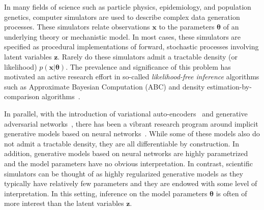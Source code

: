 \documentclass[twocolumn,superscriptaddress,aps]{revtex4-1}
\newcommand{\kcnote}[1]{\textcolor{red}{[KC: #1]}}
\newcommand{\bftheta}{{\bm \theta}}
\newcommand{\bfx}{\mathbf{x}}
\newcommand{\bfz}{\mathbf{z}}
\theoremstyle{plain}
\begin{document}
In many fields of science such as particle physics, epidemiology,  and population
genetics, computer simulators are used to describe complex data generation processes. These simulators relate
observations $\bfx$ to the parameters $\bftheta$ of an underlying theory or mechanistic model.
In most cases, these simulators are specified as procedural implementations of forward, stochastic processes involving latent variables $\bfz$.
Rarely do these simulators admit a tractable density (or likelihood) $p(\bfx |
\bftheta)$. The prevalence and significance of this problem has motivated an
active research effort in so-called \textit{likelihood-free inference}
algorithms such as Approximate Bayesian Computation
(ABC) and density estimation-by-comparison algorithms~\cite{beaumont2002approximate, marjoram2003markov, sisson2007sequential,
sisson2011likelihood, marin2012approximate, cranmer2015approximating}.




In parallel, with the introduction of variational
auto-encoders~\citep{DBLP:journals/corr/KingmaW13} and generative adversarial
networks~\cite{goodfellow2014generative}, there has been a vibrant research
program around implicit generative models based on neural
networks~\citep{2016arXiv161003483M}.  While some of these models
also do not admit a tractable density, they are all differentiable by construction.
In addition, generative models based on neural networks are highly parametrized and the model
parameters have no obvious interpretation. In contrast, scientific simulators
can be thought of as highly regularized generative models as they typically have
relatively few parameters and they are endowed with some level of
interpretation. In this setting, inference on the model parameters $\bftheta$ is
often of more interest than the latent variables $\bfz$.
\end{document}
